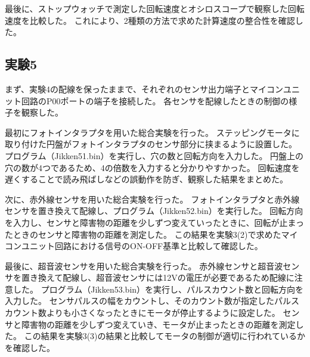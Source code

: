 \documentclass[../../../main]{subfiles}
\begin{document}
最後に、ストップウォッチで測定した回転速度とオシロスコープで観察した回転速度を比較した。
これにより、2種類の方法で求めた計算速度の整合性を確認した。


\subsection{実験5}

まず、実験4の配線を保ったままで、それぞれのセンサ出力端子とマイコンユニット回路のP00ポートの端子を接続した。
各センサを配線したときの制御の様子を観察した。

最初にフォトインタラプタを用いた総合実験を行った。
ステッピングモータに取り付けた円盤がフォトインタラプタのセンサ部分に挟まるように設置した。
プログラム（Jikken51.bin）を実行し、穴の数と回転方向を入力した。
円盤上の穴の数が4つであるため、4の倍数を入力すると分かりやすかった。
回転速度を遅くすることで読み飛ばしなどの誤動作を防ぎ、観察した結果をまとめた。

次に、赤外線センサを用いた総合実験を行った。
フォトインタラプタと赤外線センサを置き換えて配線し、プログラム（Jikken52.bin）を実行した。
回転方向を入力し、センサと障害物の距離を少しずつ変えていったときに、回転が止まったときのセンサと障害物の距離を測定した。
この結果を実験3(2)で求めたマイコンユニット回路における信号のON-OFF基準と比較して確認した。

最後に、超音波センサを用いた総合実験を行った。
赤外線センサと超音波センサを置き換えて配線し、超音波センサには12Vの電圧が必要であるため配線に注意した。
プログラム（Jikken53.bin）を実行し、パルスカウント数と回転方向を入力した。
センサパルスの幅をカウントし、そのカウント数が指定したパルスカウント数よりも小さくなったときにモータが停止するように設定した。
センサと障害物の距離を少しずつ変えていき、モータが止まったときの距離を測定した。
この結果を実験3(3)の結果と比較してモータの制御が適切に行われているかを確認した。
\end{document}
